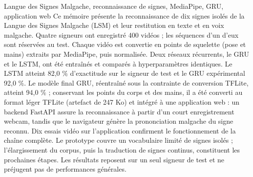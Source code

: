 \begin{sommaire}{Langue des Signes Malgache, reconnaissance de signes, MediaPipe, GRU, application web}
Ce mémoire présente la reconnaissance de dix signes isolés de la Langue des Signes Malgache (LSM) et leur restitution en texte et en voix malgache. Quatre signeurs ont enregistré 400 vidéos ; les séquences d’un d’eux sont réservées au test. Chaque vidéo est convertie en points de squelette (pose et mains) extraits par MediaPipe, puis normalisée. Deux réseaux récurrents, le GRU et le LSTM, ont été entraînés et comparés à hyperparamètres identiques. Le LSTM atteint 82,0 \% d’exactitude sur le signeur de test et le GRU expérimental 92,0 \%. Le modèle final GRU, réentraîné sous la contrainte de conversion TFLite, atteint 94,0 \% ; conservant les points du corps et des mains, il a été converti au format léger TFLite (artefact de 247 Ko) et intégré à une application web : un backend FastAPI assure la reconnaissance à partir d’un court enregistrement webcam, tandis que le navigateur génère la prononciation malgache du signe reconnu. Dix essais vidéo sur l’application confirment le fonctionnement de la chaîne complète. Le prototype couvre un vocabulaire limité de signes isolés ; l’élargissement du corpus, puis la traduction de signes continus, constituent les prochaines étapes. Les résultats reposent sur un seul signeur de test et ne préjugent pas de performances générales.

\end{sommaire}

\begin{abstract}{Automatic recognition of isolated Malagasy Sign Language signs}{Malagasy Sign Language, sign recognition, MediaPipe, GRU, web application}
This thesis presents the recognition of ten isolated Malagasy Sign Language (LSM) signs and their restitution as text and spoken Malagasy. Four signers recorded 400 videos, and one signer is held out for testing. Each video is converted into pose and hand skeleton points extracted with MediaPipe and then normalised. Two recurrent networks, GRU and LSTM, were trained and compared under identical hyperparameters: the LSTM reaches 82.0\% accuracy on the test signer and the experimental GRU 92.0\%. The final GRU model, retrained under the TFLite conversion constraint, reaches 94.0\% accuracy; keeping both body and hand landmarks, it was converted to the lightweight TFLite format (a 247 KB artifact) and is deployed in a web application: a FastAPI backend performs the recognition from a short webcam recording, while the browser generates the Malagasy pronunciation of the recognized sign. Ten video tests on the application confirm that the complete chain works. The prototype covers a limited vocabulary of isolated signs; widening the corpus, and then translating continuous signs, are the next steps. The results rely on a single test signer and do not reflect general performance.

\end{abstract}
